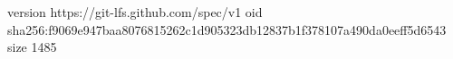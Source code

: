 version https://git-lfs.github.com/spec/v1
oid sha256:f9069e947baa8076815262c1d905323db12837b1f378107a490da0eeff5d6543
size 1485
